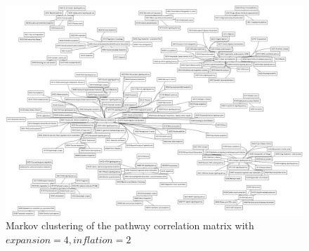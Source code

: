 \documentclass[12pt,a4paper,twoside,openright]{report}
\begin{document}
\begin{landscape}

\begin{figure}[!htb]
\includegraphics[height=\textwidth]{pathway-cluster.eps}
\caption{Markov clustering of the pathway correlation matrix with $\mathit{expansion}=4, \mathit{inflation}=2$}
\label{fig:pathway-cluster}
\end{figure}

\end{landscape}
\end{document}
